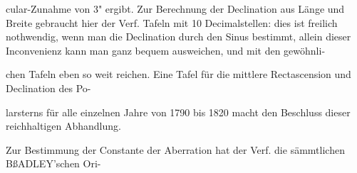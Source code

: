 \documentclass[10pt,a4paper]{article}
\begin{document}
cular-Zunahme von 3" ergibt. Zur Berechnung der Declination aus Länge und Breite gebraucht hier der Verf. Tafeln mit 10 Decimalstellen: dies ist freilich nothwendig, wenn man die Declination durch den Sinus bestimmt, allein dieser Inconvenienz kann man ganz bequem ausweichen, und mit den gewöhnli-

chen Tafeln eben so weit reichen. Eine Tafel für die mittlere Rectascension und Declination des Po-

larsterns für alle einzelnen Jahre von 1790 bis 1820 macht den Beschluss dieser reichhaltigen Abhandlung.

Zur Bestimmung der Constante der Aberration hat der Verf. die sämmtlichen BßADLEY'schen Ori-
\end{document}
